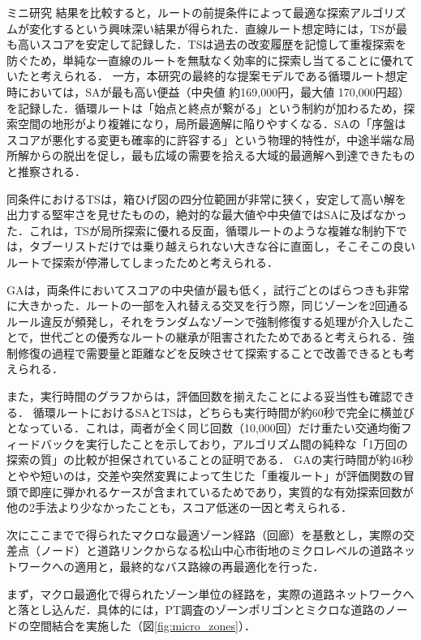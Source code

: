\begin{column}{ミニ研究}
結果を比較すると，ルートの前提条件によって最適な探索アルゴリズムが変化するという興味深い結果が得られた．直線ルート想定時には，TSが最も高いスコアを安定して記録した．TSは過去の改変履歴を記憶して重複探索を防ぐため，単純な一直線のルートを無駄なく効率的に探索し当てることに優れていたと考えられる．
一方，本研究の最終的な提案モデルである循環ルート想定時においては，SAが最も高い便益（中央値 約169,000円，最大値 170,000円超）を記録した．循環ルートは「始点と終点が繋がる」という制約が加わるため，探索空間の地形がより複雑になり，局所最適解に陥りやすくなる．SAの「序盤はスコアが悪化する変更も確率的に許容する」という物理的特性が，中途半端な局所解からの脱出を促し，最も広域の需要を拾える大域的最適解へ到達できたものと推察される．

同条件におけるTSは，箱ひげ図の四分位範囲が非常に狭く，安定して高い解を出力する堅牢さを見せたものの，絶対的な最大値や中央値ではSAに及ばなかった．これは，TSが局所探索に優れる反面，循環ルートのような複雑な制約下では，タブーリストだけでは乗り越えられない大きな谷に直面し，そこそこの良いルートで探索が停滞してしまったためと考えられる．

GAは，両条件においてスコアの中央値が最も低く，試行ごとのばらつきも非常に大きかった．ルートの一部を入れ替える交叉を行う際，同じゾーンを2回通るルール違反が頻発し，それをランダムなゾーンで強制修復する処理が介入したことで，世代ごとの優秀なルートの継承が阻害されたためであると考えられる．強制修復の過程で需要量と距離などを反映させて探索することで改善できるとも考えられる．

また，実行時間のグラフからは，評価回数を揃えたことによる妥当性も確認できる．
循環ルートにおけるSAとTSは，どちらも実行時間が約60秒で完全に横並びとなっている．これは，両者が全く同じ回数（10,000回）だけ重たい交通均衡フィードバックを実行したことを示しており，アルゴリズム間の純粋な「1万回の探索の質」の比較が担保されていることの証明である．
GAの実行時間が約46秒とやや短いのは，交差や突然変異によって生じた「重複ルート」が評価関数の冒頭で即座に弾かれるケースが含まれているためであり，実質的な有効探索回数が他の2手法より少なかったことも，スコア低迷の一因と考えられる．

次にここまでで得られたマクロな最適ゾーン経路（回廊）を基敷とし，実際の交差点（ノード）と道路リンクからなる松山中心市街地のミクロレベルの道路ネットワークへの適用と，最終的なバス路線の再最適化を行った．

まず，マクロ最適化で得られたゾーン単位の経路を，実際の道路ネットワークへと落とし込んだ．具体的には，PT調査のゾーンポリゴンとミクロな道路のノードの空間結合を実施した（図\ref{fig:micro_zones}）．


\end{column}
